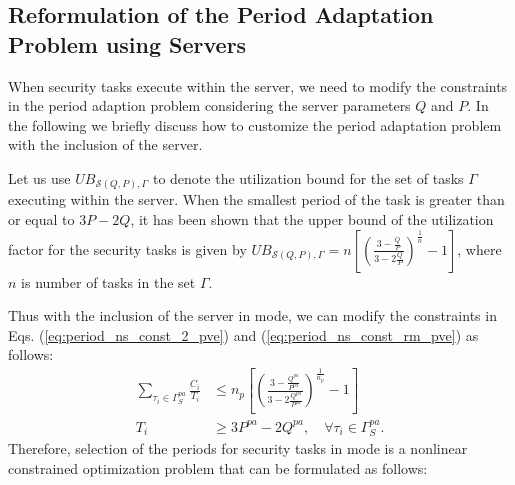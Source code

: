 \documentclass[../rt_server_main.tex]{subfiles}
\begin{document}


\subsection{Reformulation of the Period Adaptation Problem using Servers} \label{subsec:period_adapt_server}

When security tasks execute within the server, we need to modify the constraints in the period adaption problem considering the server parameters $Q$ and $P$. In the following we briefly discuss how to customize the period adaptation problem with the inclusion of the server.





 Let us use $UB_{\mathcal{S}(Q, P), \Gamma}$ to denote the utilization bound for the set of tasks $\Gamma$ executing within the server.  
When the smallest period of the task is greater than or equal to $3P - 2Q$, it has been shown \cite{serverBound_raj} that the upper bound of the utilization factor for the security tasks is given by
$
UB_{\mathcal{S}(Q, P), \Gamma} = n \left[ \left( \tfrac{3 - \tfrac{Q}{P}}{3 - 2 \tfrac{Q}{P}} \right)^{\frac{1}{n}} - 1 \right]$,
where $n$ is number of tasks in the set $\Gamma$.

Thus with the inclusion of the server in \pve mode, we can modify the constraints in Eqs. (\ref{eq:period_ns_const_2_pve}) and (\ref{eq:period_ns_const_rm_pve}) as follows:
\begin{subequations}
\begin{align} %
\sum_{\tau_i \in \Gamma_S^{pa}}\frac{C_i}{T_i} &\leq  n_p \left[ \left( \tfrac{3 - \tfrac{Q^{pa}}{P^{pa}}}{3 - 2 \tfrac{Q^{pa}}{P^{pa}}} \right)^{\frac{1}{n_p}} - 1 \right] \label{eq:period_const_2_pve} \\ 
T_i &\geq 3P^{pa} - 2Q^{pa}, \quad \forall \tau_i \in \Gamma_S^{pa}. \label{eq:period_const_4_pve}
\end{align}
\end{subequations}
Therefore, selection of the periods for security tasks in \pve mode %
is a nonlinear constrained optimization problem that can be formulated as follows: 
\end{document}
